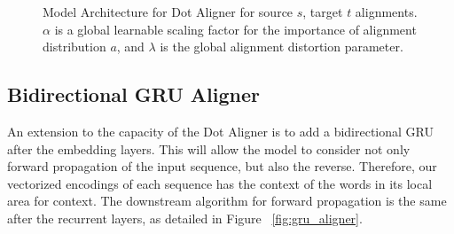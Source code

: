 \documentclass[twoside,twocolumn]{article}
\begin{document}
\begin{figure}
  \centering
  \caption{Model Architecture for Dot Aligner for source $s$, target $t$ alignments. $\alpha$ is a global learnable scaling factor for the importance of alignment distribution $a$, and $\lambda$ is the global alignment distortion parameter.}
  \label{fig:dot_aligner}
\end{figure}

\subsection{Bidirectional GRU Aligner}

An extension to the capacity of the Dot Aligner is to add a bidirectional GRU after the embedding layers. This will allow the model to consider not only forward propagation of the input sequence, but also the reverse. Therefore, our vectorized encodings of each sequence has the context of the words in its local area for context. The downstream algorithm for forward propagation is the same after the recurrent layers, as detailed in Figure ~\ref{fig:gru_aligner}.
\end{document}
